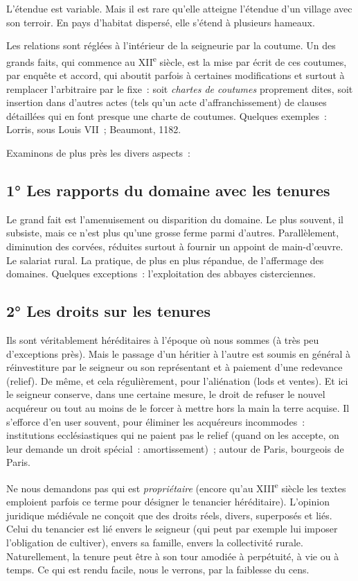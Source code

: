\documentclass[french,twoside]{book} %
\begin{document}
\noindent L’étendue est variable. Mais il est rare qu’elle atteigne l’étendue d’un village avec son terroir. En pays d’habitat dispersé, elle s’étend à plusieurs hameaux.\par
Les relations sont réglées à l’intérieur de la seigneurie par la coutume. Un des grands faits, qui commence au XII\textsuperscript{e} siècle, est la mise par écrit de ces coutumes, par enquête et accord, qui aboutit parfois à certaines modifications et surtout à remplacer l’arbitraire  
\label{p57} par le fixe : soit \emph{chartes de coutumes} proprement dites, soit insertion dans d’autres actes (tels qu’un acte d’affranchissement) de clauses détaillées qui en font presque une charte de coutumes. Quelques exemples : Lorris, sous Louis VII ; Beaumont, 1182.\par
Examinons de plus près les divers aspects :\par
\subsection[{1° Les rapports du domaine avec les tenures}]{1° Les rapports du domaine avec les tenures}
\noindent Le grand fait est l’amenuisement ou disparition du domaine. Le plus souvent, il subsiste, mais ce n’est plus qu’une grosse ferme parmi d’autres. Parallèlement, diminution des corvées, réduites surtout à fournir un appoint de main-d’œuvre. Le salariat rural. La pratique, de plus en plus répandue, de l’affermage des domaines. Quelques exceptions : l’exploitation des abbayes cisterciennes.
\subsection[{2° Les droits sur les tenures}]{2° Les droits sur les tenures}
\noindent Ils sont véritablement héréditaires à l’époque où nous sommes (à très peu d’exceptions près). Mais le passage d’un héritier à l’autre est soumis en général à réinvestiture par le seigneur ou son représentant et à paiement d’une redevance (relief). De même, et cela régulièrement, pour l’aliénation (lods et ventes). Et ici le seigneur conserve, dans une certaine mesure, le droit de refuser le nouvel acquéreur ou tout au moins de le forcer à mettre hors la main la terre acquise. Il s’efforce d’en user souvent, pour éliminer les acquéreurs incommodes : institutions ecclésiastiques qui ne paient pas le relief (quand on les accepte, on leur demande un droit spécial : amortissement) ; autour de Paris, bourgeois de Paris.\par
Ne nous demandons pas qui est \emph{propriétaire} (encore qu’au XIII\textsuperscript{e} siècle les textes emploient parfois ce terme pour désigner le tenancier héréditaire). L’opinion juridique médiévale ne conçoit que des droits réels, divers, superposés et liés. Celui du tenancier est lié envers le seigneur (qui peut par exemple lui imposer l’obligation de cultiver), envers sa famille, envers la collectivité rurale. Naturellement, la tenure peut être à son tour amodiée à perpétuité, à vie ou à temps. Ce qui est rendu facile, nous le verrons, par la faiblesse du cens.
\end{document}
